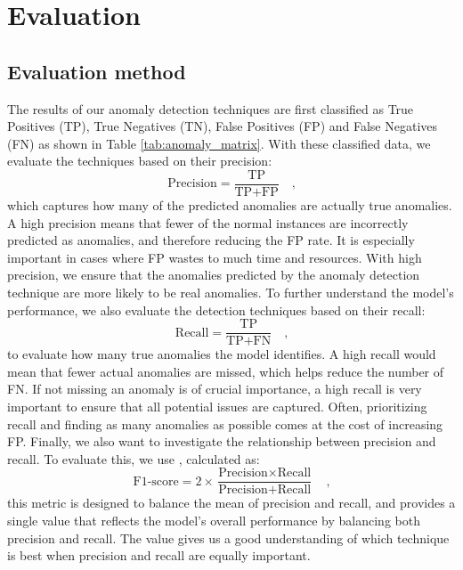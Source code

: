 





\chapter{Evaluation}
\label{cha:evaluation}

\section{Evaluation method}

The results of our anomaly detection techniques are first classified as True Positives (TP), True Negatives (TN), False Positives (FP) and False Negatives (FN) as shown in Table \ref{tab:anomaly_matrix}. With these classified data, we evaluate the techniques based on their precision:
$$ 
\text{Precision} = \frac{\text{TP}}{\text{TP} + \text{FP}} \quad \text{,}
$$
which captures how many of the predicted anomalies are actually true anomalies. A high precision means that fewer of the normal instances are incorrectly predicted as anomalies, and therefore reducing the FP rate. It is especially important in cases where FP wastes to much time and resources. With high precision, we ensure that the anomalies predicted by the anomaly detection technique are more likely to be real anomalies. To further understand the model's performance, we also evaluate the detection techniques based on their recall: 
$$
\text{Recall} = \frac{\text{TP}}{\text{TP} + \text{FN}} \quad \text{,}
$$
to evaluate how many true anomalies the model identifies. A high recall would mean that fewer actual anomalies are missed, which helps reduce the number of FN. If not missing an anomaly is of crucial importance, a high recall is very important to ensure that all potential issues are captured. Often, prioritizing recall and finding as many anomalies as possible comes at the cost of increasing FP. Finally, we also want to investigate the relationship between precision and recall. To evaluate this, we use , calculated as: 
$$
\text{F1-score} = 2 \times \frac{\text{Precision} \times \text{Recall}}{\text{Precision} + \text{Recall}} \quad \text{,}
$$
this metric is designed to balance the mean of precision and recall, and provides a single value that reflects the model's overall performance by balancing both precision and recall. The value gives us a good understanding of which technique is best when precision and recall are equally important. 

